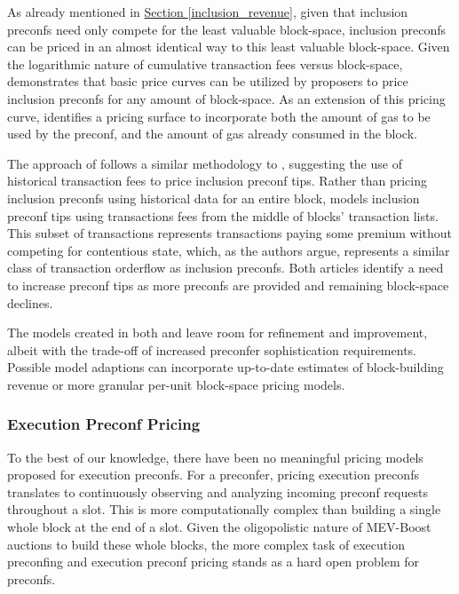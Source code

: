 \documentclass[a4paper]{article}
\theoremstyle{boldstyle}
\begin{document}
     As already mentioned in \hyperref[inclusion_revenue]{Section \ref{inclusion_revenue}}, given that inclusion preconfs need only compete for the least valuable block-space, inclusion preconfs can be priced in an almost identical way to this least valuable block-space. Given the logarithmic nature of cumulative transaction fees versus block-space, \cite{W:APricingModelforInclusionPreconfirmations} demonstrates that basic price curves can be utilized by proposers to price inclusion preconfs for any amount of block-space. As an extension of this pricing curve,  \cite{W:APricingModelforInclusionPreconfirmations} identifies a pricing surface to incorporate both the amount of gas to be used by the preconf, and the amount of gas already consumed in the block. 
     
    The approach of \cite{W:PricingTransactionsforPreconfirmation} follows a similar methodology to \cite{W:APricingModelforInclusionPreconfirmations}, suggesting the use of historical transaction fees to price inclusion preconf tips. Rather than pricing inclusion preconfs using historical data for an entire block, \cite{W:PricingTransactionsforPreconfirmation} models inclusion preconf tips using transactions fees from the middle of blocks' transaction lists. This subset of transactions represents transactions paying some premium without competing for contentious state, which, as the authors argue, represents a similar class of transaction orderflow as inclusion preconfs. Both articles identify a need to increase preconf tips as more preconfs are provided and remaining block-space declines. 
    
    The models created in both \cite{W:APricingModelforInclusionPreconfirmations} and \cite{W:PricingTransactionsforPreconfirmation} leave room for refinement and improvement, albeit with the trade-off of increased preconfer sophistication requirements. Possible model adaptions can incorporate up-to-date estimates of block-building revenue or more granular per-unit block-space pricing models. 

    \subsubsection{Execution Preconf Pricing}

    To the best of our knowledge, there have been no meaningful pricing models proposed for execution preconfs. For a preconfer, pricing execution preconfs translates to continuously observing and analyzing incoming preconf requests throughout a slot. This is more computationally complex than building a single whole block at the end of a slot. Given the oligopolistic nature of MEV-Boost auctions \cite{MEVBoostShares} to build these whole blocks, the more complex task of execution preconfing and execution preconf pricing stands as a hard open problem for preconfs. 
  
\end{document}

